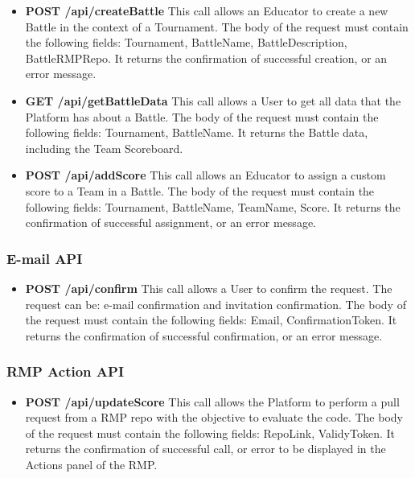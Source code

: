 \begin{itemize}
    \item \textbf{POST /api/createBattle} This call allows an Educator to create a new Battle in the context of a Tournament. The body of the request must contain the following fields: Tournament, BattleName, BattleDescription, BattleRMPRepo. It returns the confirmation of successful creation, or an error message.
    \item \textbf{GET /api/getBattleData} This call allows a User to get all data that the Platform has about a Battle. The body of the request must contain the following fields: Tournament, BattleName. It returns the Battle data, including the Team Scoreboard.
    \item \textbf{POST /api/addScore} This call allows an Educator to assign a custom score to a Team in a Battle. The body of the request must contain the following fields: Tournament, BattleName, TeamName, Score. It returns the confirmation of successful assignment, or an error message.
\end{itemize}

\subsubsection{E-mail API}
\begin{itemize}
    \item \textbf{POST /api/confirm} This call allows a User to confirm the request. The request can be: e-mail confirmation and invitation confirmation. The body of the request must contain the following fields: Email, ConfirmationToken. It returns the confirmation of successful confirmation, or an error message.
\end{itemize}
\subsubsection{RMP Action API}
\begin{itemize}
    \item \textbf{POST /api/updateScore} This call allows the Platform to perform a pull request from a RMP repo with the objective to evaluate the code. The body of the request must contain the following fields: RepoLink, ValidyToken. It returns the confirmation of successful call, or error to be displayed in the Actions panel of the RMP.
\end{itemize}

